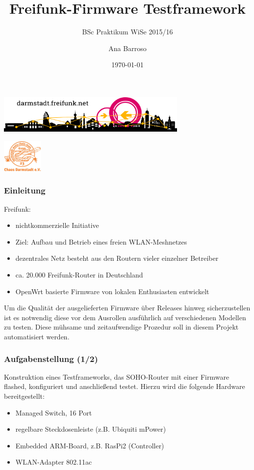 \documentclass[accentcolor=tud6b,colorbacktitle,inverttitle,landscape,german,presentation,t]{tudbeamer}
\begin{document}
	
	\title[Freifunk-Firmware Testframework]{Freifunk-Firmware Testframework}
	\subtitle{BSc Praktikum WiSe 2015/16}
	
	\author{Ana Barroso}
	
	
	\date{\today}
	
	\begin{titleframe}
		\begin{center}
			\vspace{1.5cm}
			\includegraphics[width=0.7\textwidth]{images/logo-skyline}
			\vspace{1.4cm}
		\end{center}
			\flushright
			\includegraphics[width=0.15\textwidth]{images/cda}
	\end{titleframe}
	
	\begin{frame}
		\frametitle{Einleitung}
		Freifunk:
		\begin{itemize}
			\item nichtkommerzielle Initiative
			\item Ziel: Aufbau und Betrieb eines freien WLAN-Meshnetzes
			\item dezentrales Netz besteht aus den Routern vieler einzelner Betreiber
			\item ca. 20.000 Freifunk-Router in Deutschland
			\item OpenWrt basierte Firmware von lokalen Enthusiasten entwickelt
		\end{itemize}
		\vfill
		\pause
		Um die Qualität der ausgelieferten Firmware über Releases hinweg sicherzustellen ist es notwendig diese vor dem Ausrollen ausführlich auf verschiedenen Modellen zu testen. Diese mühsame und zeitaufwendige Prozedur soll in diesem Projekt automatisiert werden.
	\end{frame}
	
	\begin{frame}
		\frametitle{Aufgabenstellung (1/2)}
		    Konstruktion eines Testframeworks, das SOHO-Router mit einer Firmware flashed,
		    konfiguriert und anschließend testet.
		    \vfill
		    Hierzu wird die folgende Hardware bereitgestellt:
		    \begin{itemize}
			    \item Managed Switch, 16 Port
			    \item regelbare Steckdosenleiste (z.B. Ubiquiti mPower)
			    \item Embedded ARM-Board, z.B. RasPi2 (Controller)
			    \item WLAN-Adapter 802.11ac
		    \end{itemize}
	\end{frame}
	
\end{document}

